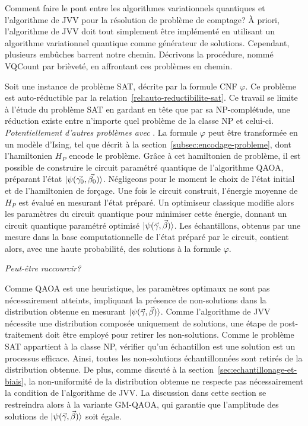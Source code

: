 Comment faire le pont entre les algorithmes variationnels quantiques et l'algorithme de JVV pour la résolution de problème de comptage? À priori, l'algorithme de JVV doit tout simplement être implémenté en utilisant un algorithme variationnel quantique comme générateur de solutions. Cependant, plusieurs embûches barrent notre chemin. Décrivons la procédure, nommé VQCount par brièveté, en affrontant ces problèmes en chemin.

Soit une instance de problème SAT, décrite par la formule CNF $\varphi$. Ce problème est auto-réductible par la relation~\ref{rel:auto-reductibilite-sat}. Ce travail se limite à l'étude du problème SAT en gardant en tête que par sa \textsf{NP}-complétude, une réduction existe entre n'importe quel problème de la classe \textsf{NP} et celui-ci. \textcolor{mydarkred}{\textit{Potentiellement d'autres problèmes avec }}. La formule $\varphi$ peut être transformée en un modèle d'Ising, tel que décrit à la section~\ref{subsec:encodage-probleme}, dont l'hamiltonien $H_{P}$ encode le problème. Grâce à cet hamiltonien de problème, il est possible de construire le circuit paramétré quantique de l'algorithme QAOA, préparant l'état $\ket{\psi(\vec{\gamma_{0}}, \vec{\beta_{0}})}$. Négligeons pour le moment le choix de l'état initial et de l'hamiltonien de forçage. Une fois le circuit construit, l'énergie moyenne de $H_{P}$ est évalué en mesurant l'état préparé. Un optimiseur classique modifie alors les paramètres du circuit quantique pour minimiser cette énergie, donnant un circuit quantique paramétré optimisé $\ket{\psi(\vec{\gamma}, \vec{\beta})}$.
Les échantillons, obtenus par une mesure dans la base computationnelle de l'état préparé par le circuit, contient alors, avec une haute probabilité, des solutions à la formule $\varphi$.

\textcolor{mydarkred}{\textit{Peut-être raccourcir?}}

Comme QAOA est une heuristique, les paramètres optimaux ne sont pas nécessairement atteints, impliquant la présence de non-solutions dans la distribution obtenue en mesurant $\ket{\psi(\vec{\gamma}, \vec{\beta})}$. Comme l'algorithme de JVV nécessite une distribution composée uniquement de solutions, une étape de post-traitement doit être employé pour retirer les non-solutions. Comme le problème SAT appartient à la classe \textsf{NP}, vérifier qu'un échantillon est une solution est un processus efficace. Ainsi, toutes les non-solutions échantillonnées sont retirés de la distribution obtenue. De plus, comme discuté à la section~\ref{sec:echantillonage-et-biais}, la non-uniformité de la distribution obtenue ne respecte pas nécessairement la condition de l'algorithme de JVV. La discussion dans cette section se restreindra alors à la variante GM-QAOA, qui garantie que l'amplitude des solutions de $\ket{\psi(\vec{\gamma}, \vec{\beta})}$ soit égale. 

